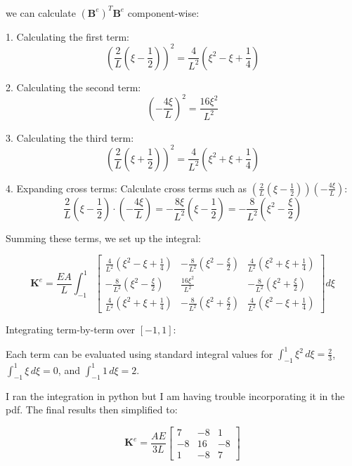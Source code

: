 \documentclass{article}
\begin{document}
we can calculate \( (\mathbf{B}^e)^T \mathbf{B}^e \) component-wise:

1. Calculating the first term:
   \[
   \left( \frac{2}{L} \left( \xi - \frac{1}{2} \right) \right)^2 = \frac{4}{L^2} \left( \xi^2 - \xi + \frac{1}{4} \right)
   \]

2. Calculating the second term:
   \[
   \left( -\frac{4\xi}{L} \right)^2 = \frac{16\xi^2}{L^2}
   \]

3. Calculating the third term:
   \[
   \left( \frac{2}{L} \left( \xi + \frac{1}{2} \right) \right)^2 = \frac{4}{L^2} \left( \xi^2 + \xi + \frac{1}{4} \right)
   \]

4. Expanding cross terms: Calculate cross terms such as \( \left( \frac{2}{L} \left( \xi - \frac{1}{2} \right) \right) \left( -\frac{4\xi}{L} \right) \):
   \[
   \frac{2}{L} \left( \xi - \frac{1}{2} \right) \cdot \left( -\frac{4\xi}{L} \right) = -\frac{8\xi}{L^2} \left( \xi - \frac{1}{2} \right) = -\frac{8}{L^2} \left( \xi^2 - \frac{\xi}{2} \right)
   \]

Summing these terms, we set up the integral:

\[
    \mathbf{K}^e = \frac{E A}{L} \int_{-1}^{1} \begin{bmatrix} \frac{4}{L^2} \left( \xi^2 - \xi + \frac{1}{4} \right) & -\frac{8}{L^2} \left( \xi^2 - \frac{\xi}{2} \right) & \frac{4}{L^2} \left( \xi^2 + \xi + \frac{1}{4} \right) \\ -\frac{8}{L^2} \left( \xi^2 - \frac{\xi}{2} \right) & \frac{16 \xi^2}{L^2} & -\frac{8}{L^2} \left( \xi^2 + \frac{\xi}{2} \right) \\ \frac{4}{L^2} \left( \xi^2 + \xi + \frac{1}{4} \right) & -\frac{8}{L^2} \left( \xi^2 + \frac{\xi}{2} \right) & \frac{4}{L^2} \left( \xi^2 - \xi + \frac{1}{4} \right) \end{bmatrix} d\xi
\]

Integrating term-by-term over \([-1, 1]\):

Each term can be evaluated using standard integral values for \(\int_{-1}^{1} \xi^2 \, d\xi = \frac{2}{3}\), \(\int_{-1}^{1} \xi \, d\xi = 0\), and \(\int_{-1}^{1} 1 \, d\xi = 2\).

I ran the integration in python but I am having trouble incorporating it in the pdf. The final results then simplified to:

\begin{equation}
    \mathbf{K}^e = \frac{A E}{3 L} \begin{bmatrix} 7 & -8 & 1 \\ -8 & 16 & -8 \\ 1 & -8 & 7 \end{bmatrix}
\end{equation}
\end{document}
